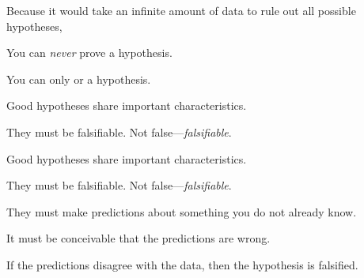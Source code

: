 \documentclass[t]{beamer}
\begin{document}
\begin{frame}[t]{Because it would take an infinite amount of data to rule out all possible hypotheses,}

\hangpara You can \emph{never} prove a hypothesis.

\hangpara You can only  or  a hypothesis.

\end{frame}



\begin{frame}[t]{Good hypotheses share important characteristics.}

\hangpara They must be falsifiable. Not false—\emph{falsifiable}.

\end{frame}


{
\begin{frame}[b]

\end{frame}
}

%
\begin{frame}[t]{Good hypotheses share important characteristics.}

\hangpara They must be falsifiable. Not false—\emph{falsifiable}.


\hangpara They must make predictions about something you do not already know.
\pause

\hangpara It must be conceivable that the predictions are wrong. 
\pause

\hangpara If the predictions disagree with the data, then the hypothesis is falsified.

\end{frame}
\end{document}
